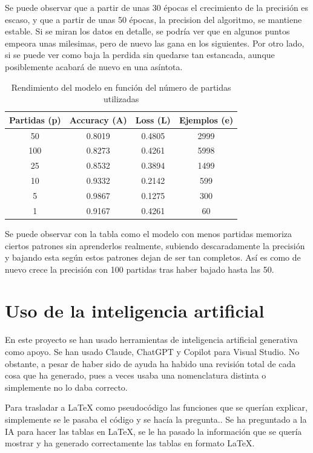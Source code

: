 \documentclass[conference,a4paper]{IEEEtran}
\begin{document}
\vspace{9em}


Se puede observar que a partir de unas 30 épocas el crecimiento de la precisión es escaso, y que a partir de unas 50 épocas, la precision del algoritmo, se mantiene estable. Si se miran los datos en detalle, se podría ver que en algunos puntos empeora unas milesimas, pero de nuevo las gana en los siguientes. Por otro lado, si se puede ver como baja la perdida sin quedarse tan estancada, aunque posiblemente acabará de nuevo en una asíntota.


\begin{table}[h]
\centering
\caption{Rendimiento del modelo en función del número de partidas utilizadas}
\label{tab:partidas_accuracy_loss}
\begin{tabular}{c c c c}
\hline
\textbf{Partidas (p)} & \textbf{Accuracy (A)} & \textbf{Loss (L)} & \textbf{Ejemplos (e)} \\
\hline
50  & 0.8019 & 0.4805 & 2999 \\
100 & 0.8273 & 0.4261 & 5998 \\
25  & 0.8532 & 0.3894 & 1499 \\
10  & 0.9332 & 0.2142 & 599  \\
5   & 0.9867 & 0.1275 & 300  \\
1   & 0.9167 & 0.4261 & 60   \\
\hline
\end{tabular}
\end{table}


Se puede observar con la tabla como el modelo con menos partidas memoriza ciertos patrones sin aprenderlos realmente, subiendo descaradamente la precisión y bajando esta según estos patrones dejan de ser tan completos. Así es como de nuevo crece la precisión con 100 partidas tras haber bajado hasta las 50.



\section{Uso de la inteligencia artificial}\label{sec:Uso de IA}
En este proyecto se han usado herramientas de inteligencia artificial generativa como apoyo. Se han usado Claude, ChatGPT y Copilot para Visual Studio. No obstante, a pesar de haber sido de ayuda ha habido una revisión total de cada cosa que ha generado, pues a veces usaba una nomenclatura distinta o simplemente no lo daba correcto.

Para trasladar a \LaTeX{} como pseudocódigo las funciones que se querían explicar, simplemente se le pasaba el código y se hacía la pregunta..
Se ha preguntado a la IA para hacer las tablas en \LaTeX{}, se le ha pasado la información que se quería mostrar y ha generado correctamente las tablas en formato \LaTeX{}.
\end{document}
